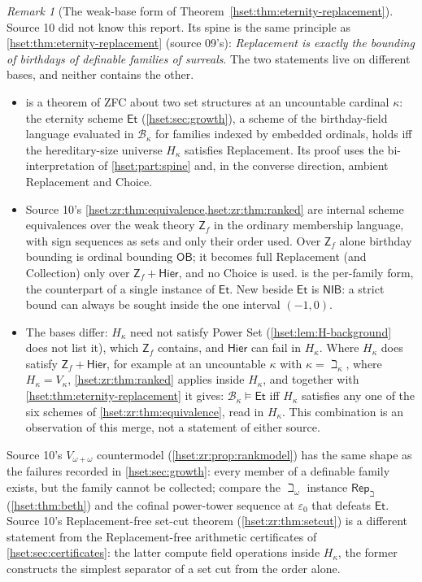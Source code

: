 \documentclass[11pt,letterpaper]{article}
\theoremstyle{definition}
\theoremstyle{remark}
\newtheorem{remark}[remark]{Remark}\aliascntresetthe{remark}
\newcommand{\B}{\mathcal B}
\newcommand{\Et}{\mathsf{Et}}
\newcommand{\RepB}{\mathsf{Rep}_{\beth}}
\newcommand{\Zf}{\mathsf{Z}_{\!f}}
\newcommand{\Hier}{\mathsf{Hier}}
\newcommand{\OB}{\mathsf{OB}}
\newcommand{\NIB}{\mathsf{NIB}}
\begin{document}
\begin{remark}[The weak-base form of Theorem~\ref{hset:thm:eternity-replacement}]
\label{hset:zr:rem:eternity}
Source 10 did not know this report. Its spine is the same principle as
\cref{hset:thm:eternity-replacement} (source 09's): \emph{Replacement is exactly
the bounding of birthdays of definable families of surreals}. The two
statements live on different bases, and neither contains the other.
\begin{itemize}
\item {} is a theorem of ZFC about two set
structures at an uncountable cardinal $\kappa$: the eternity scheme $\Et$
(\cref{hset:sec:growth}), a scheme of the birthday-field language evaluated in
$\B_\kappa$ for families indexed by embedded ordinals, holds iff the
hereditary-size universe $H_\kappa$ satisfies Replacement. Its proof uses the
bi-interpretation of \cref{hset:part:spine} and, in the converse direction,
ambient Replacement and Choice.
\item Source 10's \cref{hset:zr:thm:equivalence,hset:zr:thm:ranked} are
internal scheme equivalences over the weak theory $\Zf$ in the ordinary
membership language, with sign sequences as sets and only their order used.
Over $\Zf$ alone birthday bounding is ordinal bounding $\OB$; it becomes full
Replacement (and Collection) only over $\Zf+\Hier$, and no Choice is used.
 is the per-family form, the counterpart of a
single instance of $\Et$. New beside $\Et$ is $\NIB$: a strict bound can
always be sought inside the one interval $(-1,0)$.
\item The bases differ: $H_\kappa$ need not satisfy Power Set
(\cref{hset:lem:H-background} does not list it), which $\Zf$ contains, and
$\Hier$ can fail in $H_\kappa$. Where $H_\kappa$ does satisfy $\Zf+\Hier$, for
example at an uncountable $\kappa$ with $\kappa=\beth_\kappa$, where
$H_\kappa=V_\kappa$, \cref{hset:zr:thm:ranked} applies inside $H_\kappa$, and
together with \cref{hset:thm:eternity-replacement} it gives: $\B_\kappa\models\Et$
iff $H_\kappa$ satisfies any one of the six schemes of
\cref{hset:zr:thm:equivalence}, read in $H_\kappa$. This combination is an
observation of this merge, not a statement of either source.
\end{itemize}
Source 10's $V_{\omega+\omega}$ countermodel (\cref{hset:zr:prop:rankmodel})
has the same shape as the failures recorded in \cref{hset:sec:growth}: every
member of a definable family exists, but the family cannot be collected; compare
the $\beth_\omega$ instance $\RepB$ (\cref{hset:thm:beth}) and the cofinal
power-tower sequence at $\varepsilon_0$ that defeats $\Et$. Source 10's
Replacement-free set-cut theorem (\cref{hset:zr:thm:setcut}) is a different
statement from the Replacement-free arithmetic certificates of
\cref{hset:sec:certificates}: the latter compute field operations inside
$H_\kappa$, the former constructs the simplest separator of a set cut from the
order alone.
\end{remark}
\end{document}
